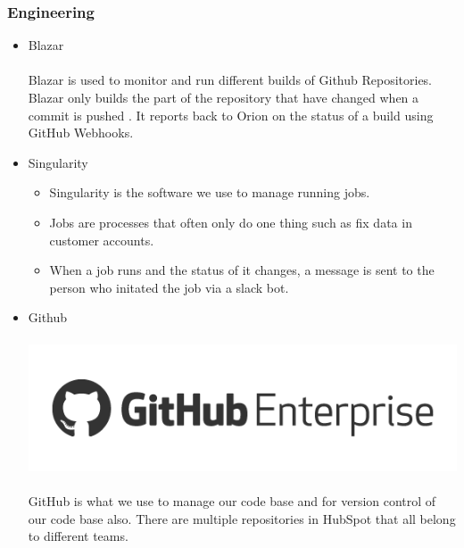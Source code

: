 \documentclass[11pt]{article} %
\begin{document}
\subsubsection{\textbf{Engineering}}
\begin{itemize}
\item Blazar\\\\
Blazar is used to monitor and run different builds of Github Repositories. Blazar only builds the part of the repository that have changed when a commit is pushed . It reports back to Orion on the status of a build using GitHub Webhooks.
\item Singularity
\begin{itemize}
\item Singularity is the software we use to manage running jobs. 
\item Jobs are processes that often only do one thing such as fix data in customer accounts.
\item When a job runs and the status of it changes,  a message is sent to the person who initated the job via a slack bot. 
\end{itemize}
\item Github \\\\
\includegraphics[scale=0.2]{github.png}\\\\
GitHub is what we use to manage our code base and for version control of our code base also.  There are multiple repositories in HubSpot that all belong to different teams. 
\end{itemize}
\end{document}
